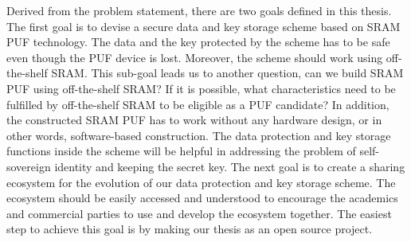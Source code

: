 Derived from the problem statement, there are two goals defined in this thesis. The first goal is to devise a secure data and key storage scheme based on SRAM PUF technology. The data and the key protected by the scheme has to be safe even though the PUF device is lost. Moreover, the scheme should work using off-the-shelf SRAM. This sub-goal leads us to another question, can we build SRAM PUF using off-the-shelf SRAM? If it is possible, what characteristics need to be fulfilled by off-the-shelf SRAM to be eligible as a PUF candidate?
In addition, the constructed SRAM PUF has to work without any hardware design, or in other words, software-based construction. The data protection and key storage functions inside the scheme will be helpful in addressing the problem of self-sovereign identity and keeping the secret key.
The next goal is to create a sharing ecosystem for the evolution of our data protection and key storage scheme. The ecosystem should be easily accessed and understood to encourage the academics and commercial parties to use and develop the ecosystem together. The easiest step to achieve this goal is by making our thesis as an open source project.
